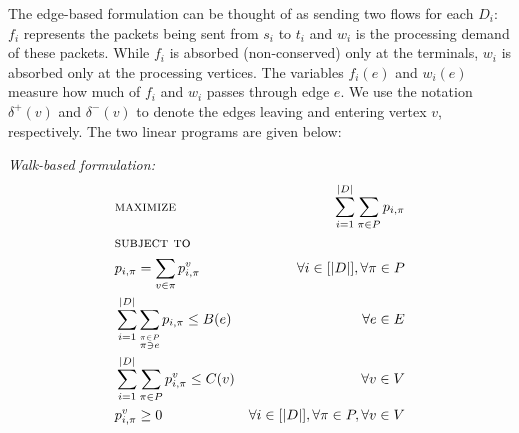 The edge-based formulation can be thought of as sending two flows for each $D_i$: $f_i$ represents the packets being sent from $s_i$ to $t_i$ and $w_i$ is the processing demand of these packets. While $f_i$ is absorbed (non-conserved) only at the terminals, $w_i$ is absorbed only at the processing vertices. The variables $f_i(e)$ and $w_i(e)$ measure how much of $f_i$ and $w_i$ passes through edge $e$. We use the notation $\delta^+(v)$ and $\delta^-(v)$ to denote the edges leaving and entering vertex $v$, respectively. The two linear programs are given below:
\newline
\begin{minipage}[t]{0.45\textwidth}
\textit{Walk-based formulation:}
\small
  \begin{subequations}
\begin{align*}
&\textsc{maximize }& \sum_{i=1}^{|D|}\sum_{\pi \in P}p_{i,\pi}
\\  
&\textsc{subject to} \\
& p_{i,\pi} = \sum \limits_{v\in \pi} p_{i,\pi}^v& \forall i \in [|D|], \forall \pi \in P \\
& \sum\limits_{i=1}^{|D|}\sum \limits_{\stackrel{\pi\in P}{\pi \ni e}} p_{i,\pi} \leq B(e) & \forall e \in E\\
&\sum\limits_{i=1}^{|D|} \sum \limits_{\pi\in P} p_{i, \pi}^v \leq C(v) &\forall v \in V \\
&p_{i,\pi}^v \geq 0 \hspace{-.5in} &\forall i\in[|D|],\forall \pi\in P,\forall v \in V
\end{align*}
\end{subequations}
\normalsize
 \end{minipage}
 \hfill
 \hspace{.2in}
